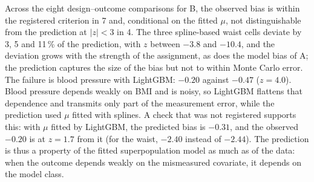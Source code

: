 Across the eight design--outcome comparisons for B, the observed bias is within the registered criterion in 7 and, conditional on the fitted $\mu$, not distinguishable from the prediction at $|z|<3$ in 4. The three spline-based waist cells deviate by 3, 5 and 11\,\% of the prediction, with $z$ between $-3.8$ and $-10.4$, and the deviation grows with the strength of the assignment, as does the model bias of A; the prediction captures the size of the bias but not to within Monte Carlo error. The failure is blood pressure with LightGBM: $-0.20$ against $-0.47$ ($z=4.0$). Blood pressure depends weakly on BMI and is noisy, so LightGBM flattens that dependence and transmits only part of the measurement error, while the prediction used $\mu$ fitted with splines. A check that was not registered supports this: with $\mu$ fitted by LightGBM, the predicted bias is $-0.31$, and the observed $-0.20$ is at $z=1.7$ from it (for the waist, $-2.40$ instead of $-2.44$). The prediction is thus a property of the fitted superpopulation model as much as of the data: when the outcome depends weakly on the mismeasured covariate, it depends on the model class.
